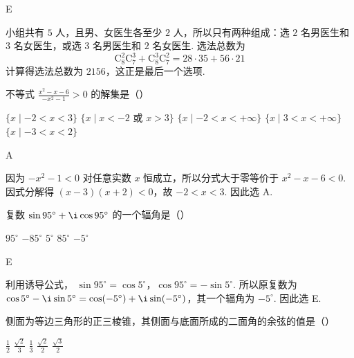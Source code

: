 \begin{answer}
E
\end{answer}

\begin{solution}
小组共有 \(5\) 人，且男、女医生各至少 \(2\) 人，所以只有两种组成：选 \(2\) 名男医生和 \(3\) 名女医生，或选 \(3\) 名男医生和 \(2\) 名女医生. 选法总数为
\[
\mathrm C_8^2\mathrm C_7^3+\mathrm C_8^3\mathrm C_7^2=28\cdot35+56\cdot21
\]
计算得选法总数为 \(2156\)，这正是最后一个选项.
\end{solution}


\begin{problem}

不等式 \(\frac{x^2 - x - 6}{-x^2 - 1} > 0\) 的解集是（\quad）

\choicesfive
    {\(\{x\mid -2 < x < 3\}\)}
    {\(\{x\mid x < -2 \text{\ 或\ } x > 3\}\)}
    {\(\{x\mid -2 < x < +\infty \}\)}
    {\(\{x\mid 3 < x < +\infty \}\)}
    {\(\{x\mid -3 < x < 2\}\)}
\end{problem}

\begin{answer}
A
\end{answer}

\begin{solution}
因为 \(-x^2-1<0\) 对任意实数 \(x\) 恒成立，所以分式大于零等价于 \(x^2-x-6<0\). 因式分解得 \((x-3)(x+2)<0\)，故 \(-2<x<3\). 因此选 A.
\end{solution}


\begin{problem}

复数 \(\sin95^{\circ}+\i\cos95^{\circ} \) 的一个辐角是（\quad）

\choicesfive
    {\(95^{\circ}\)}
    {\(-85^{\circ}\)}
    {\(5^{\circ} \)}
    {\(85^{\circ} \)}
    {\(-5^{\circ}\)}
\end{problem}

\begin{answer}
E
\end{answer}

\begin{solution}
利用诱导公式，
\(\sin95^{\circ}=\cos5^{\circ}\)，\(\cos95^{\circ}=-\sin5^{\circ}\).
所以原复数为 \(\cos5^{\circ}-\i\sin5^{\circ}=\cos(-5^{\circ})+\i\sin(-5^{\circ})\)，其一个辐角为 \(-5^{\circ}\). 因此选 E.
\end{solution}


\begin{problem}

侧面为等边三角形的正三棱锥，其侧面与底面所成的二面角的余弦的值是（\quad）

\choicesfive
    {\(\frac{1}{2}\)}
    {\(\frac{\sqrt{2}}{3}\)}
    {\(\frac{1}{3}\)}
    {\(\frac{\sqrt{2}}{2}\)}
    {\(\frac{\sqrt{3}}{2}\)}
\end{problem}

